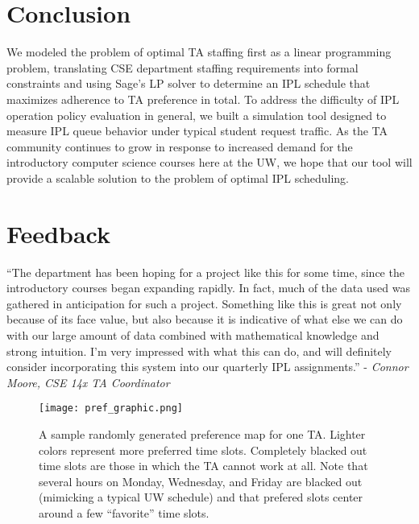 \documentclass{article}
\begin{document}
\begin{multicols}{2}
\section*{Conclusion}

We modeled the problem of optimal TA staffing first as a linear programming problem, translating CSE department staffing requirements into formal constraints and using Sage's LP solver to determine an IPL schedule that maximizes adherence to TA preference in total. To address the difficulty of IPL operation policy evaluation in general, we built a simulation tool designed to measure IPL queue behavior under typical student request traffic. As the TA community continues to grow in response to increased demand for the introductory computer science courses here at the UW, we hope that our tool will provide a scalable solution to the problem of optimal IPL scheduling.

\section*{Feedback}

``The department has been hoping for a project like this for some time, since the introductory courses began expanding rapidly. In fact, much of the data used was gathered in anticipation for such a project. Something like this is great not only because of its face value, but also because it is indicative of what else we can do with our large amount of data combined with mathematical knowledge and strong intuition. I'm very impressed with what this can do, and will definitely consider incorporating this system into our quarterly IPL assignments.'' - \textit{Connor Moore, CSE 14x TA Coordinator}




\begin{figure*}
\centering
\texttt{[image: pref\_graphic.png]}
\caption{\small{A sample randomly generated preference map for one TA. Lighter colors represent more preferred time slots. Completely blacked out time slots are those in which the TA cannot work at all. Note that several hours on Monday, Wednesday, and Friday are blacked out (mimicking a typical UW schedule) and that prefered slots center around a few ``favorite'' time slots.}}
\end{figure*}


\end{multicols}
\end{document}
